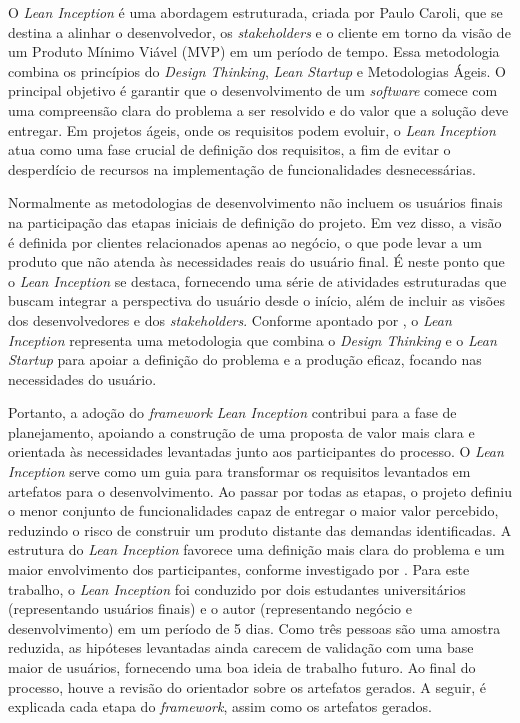 O \textit{Lean Inception} é uma abordagem estruturada, criada por Paulo Caroli, que se destina a alinhar o desenvolvedor, os \textit{stakeholders} e o cliente em torno da visão de um Produto Mínimo Viável (MVP) em um período de tempo.
Essa metodologia combina os princípios do \textit{Design Thinking}, \textit{Lean Startup} e Metodologias Ágeis.
O principal objetivo é garantir que o desenvolvimento de um \textit{software} comece com uma compreensão clara do problema a ser resolvido e do valor que a solução deve entregar.
Em projetos ágeis, onde os requisitos podem evoluir, o \textit{Lean Inception} atua como uma fase crucial de definição dos requisitos, a fim de evitar o desperdício de recursos na implementação de funcionalidades desnecessárias.

Normalmente as metodologias de desenvolvimento não incluem os usuários finais na participação das etapas iniciais de definição do projeto.
Em vez disso, a visão é definida por clientes relacionados apenas ao negócio, o que pode levar a um produto que não atenda às necessidades reais do usuário final.
É neste ponto que o \textit{Lean Inception} se destaca, fornecendo uma série de atividades estruturadas que buscam integrar a perspectiva do usuário desde o início, além de incluir as visões dos desenvolvedores e dos \textit{stakeholders}.
Conforme apontado por , o \textit{Lean Inception} representa uma metodologia que combina o \textit{Design Thinking} e o \textit{Lean Startup} para apoiar a definição do problema e a produção eficaz, focando nas necessidades do usuário.

Portanto, a adoção do \textit{framework} \textit{Lean Inception} contribui para a fase de planejamento, apoiando a construção de uma proposta de valor mais clara e orientada às necessidades levantadas junto aos participantes do processo.
O \textit{Lean Inception} serve como um guia para transformar os requisitos levantados em artefatos para o desenvolvimento.
Ao passar por todas as etapas, o projeto definiu o menor conjunto de funcionalidades capaz de entregar o maior valor percebido, reduzindo o risco de construir um produto distante das demandas identificadas.
A estrutura do \textit{Lean Inception} favorece uma definição mais clara do problema e um maior envolvimento dos participantes, conforme investigado por .
Para este trabalho, o \textit{Lean Inception} foi conduzido por dois estudantes universitários (representando usuários finais) e o autor (representando negócio e desenvolvimento) em um período de 5 dias. Como três pessoas são uma amostra reduzida, as hipóteses levantadas ainda carecem de validação com uma base maior de usuários, fornecendo uma boa ideia de trabalho futuro.
Ao final do processo, houve a revisão do orientador sobre os artefatos gerados.
A seguir, é explicada cada etapa do \textit{framework}, assim como os artefatos gerados.

